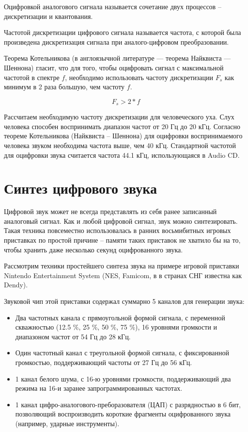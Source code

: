 Оцифровкой аналогового сигнала называется сочетание двух процессов -- дискретизации и квантования.

Частотой дискретизации цифрового сигнала называется частота, с которой была произведена дискретизация сигнала при аналого-цифровом преобразовании.

Теорема Котельникова (в англоязычной литературе — теорема Найквиста — Шеннона) гласит, что для того, чтобы оцифровать сигнал с максимальной частотой в спектре $f$, необходимо использовать частоту дискретизации $F_s$ как минимум в 2 раза большую, чем частоту $f$.

$$ F_s > 2*f $$

Рассчитаем необходимую частоту дискретизации для человеческого уха.
Слух человека способен воспринимать диапазон частот от 20 Гц до 20 кГц.
Согласно теореме Котельникова (Найквиста -- Шеннона) для оцифровки воспринимаемого человека звуком необходима частота выше, чем 40 кГц. Стандартной частотой для оцифровки звука считается частота 44.1 кГц, использующаяся в Audio CD.


\section{Синтез цифрового звука}

Цифровой звук может не всегда представлять из себя ранее записанный аналоговый сигнал.
Как и любой цифровой сигнал, звук можно синтезировать.
Такая техника повсеместно использовалась в ранних восьмибитных игровых приставках по простой причине -- памяти таких приставок не хватило бы на то, чтобы хранить даже несколько секунд оцифрованного звука.

Рассмотрим техники простейшего синтеза звука на примере игровой приставки Nintendo Entertainment System (NES, Famicom, в в странах СНГ известна как Dendy).

Звуковой чип этой приставки содержал суммарно 5 каналов для генерации звука:

\begin{itemize}
	\item Два частотных канала с прямоугольной формой сигнала, с переменной скважностью (12.5 \%, 25 \%, 50 \%, 75 \%), 16 уровнями громкости и диапазоном частот от 54 Гц до 28 кГц.
	\item Один частотный канал с треугольной формой сигнала, с фиксированной громкостью, поддерживающий частоты от 27 Гц до 56 кГц.
	\item 1 канал белого шума, с 16-ю уровнями громкости, поддерживающий два режима на 16-и заранее запрограммированных частотах. 
	\item 1 канал цифро-аналогового-преборазователя (ЦАП) с разрядностью в 6 бит, позволяющий воспроизводить короткие фрагменты оцифрованного звука (например, ударные инструменты).

\end{itemize}

